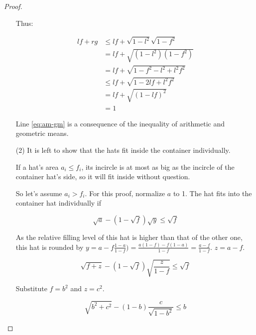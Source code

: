 \documentclass[%
    a4paper,              %
    style=screen,          %
    bibliography=totoc,   %
    nexus,                %
    lnum,                 %
    extramargin,          %
]{tubsbook}
\begin{document}
\begin{proof}
\begin{itemize}
            Thus:

            \begin{align*}
                lf + rg
                &\le lf + \sqrt{1-l^2} \sqrt{1-f^2}\\
                &= lf + \sqrt{(1-l^2)(1-f^2)}\\
                &= lf + \sqrt{1 - f^2 - l^2 + l^2f^2}\\
                &\le lf + \sqrt{1 - 2lf + l^2f^2}\tag{\theequation}\label{eq:am-gm}\\
                &= lf + \sqrt{(1-lf)^2}\\
                &= 1
            \end{align*}

            Line \ref{eq:am-gm} is a consequence of the inequality of arithmetic and geometric means.

        \item[(2)]
            It is left to show that the hats fit inside the container individually.

            If a hat's area $a_i \le f_i$, its incircle is at most as big as the incircle of the container hat's side, so it will fit inside without question.

            \begin{figure}[htbp!]
                \centering


                \caption{}
                \label{fig:hatpoke}
            \end{figure}

            So let's assume $a_i > f_i$. For this proof, normalize $a$ to 1. The hat fits into the container hat individually if

            $$\sqrt{a} - (1-\sqrt{f})\sqrt{y} \le \sqrt{f}$$

            As the relative filling level of this hat is higher than that of the other one, this hat is rounded by $y = a - f\frac{1-a}{1-f}) = \frac{a(1-f)-f(1-a)}{1-f} = \frac{a-f}{1-f}$. $z = a-f$.

            $$\sqrt{f+z} - (1-\sqrt{f})\sqrt{\frac{z}{1-f}} \le \sqrt{f}$$

            Substitute $f = b^2$ and $z = c^2$.

            $$\sqrt{b^2+c^2} - (1-b)\frac{c}{\sqrt{1-b^2}} \le b$$


\end{itemize}
\end{proof}
\end{document}

